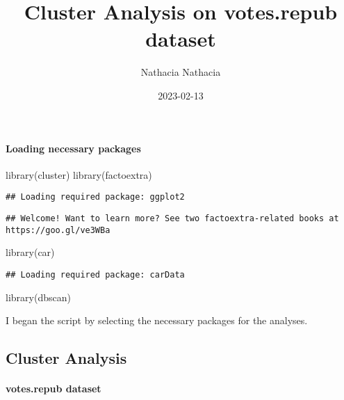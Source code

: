 \documentclass[
]{article}
\title{Cluster Analysis on votes.repub dataset}
\author{Nathacia Nathacia}
\date{2023-02-13}
\newenvironment{Shaded}{\begin{snugshade}}{\end{snugshade}}
\newcommand{\FunctionTok}[1]{\textcolor[rgb]{0.00,0.00,0.00}{#1}}
\newcommand{\NormalTok}[1]{#1}
\begin{document}
\maketitle

{
\setcounter{tocdepth}{3}
\tableofcontents
}
\hypertarget{loading-necessary-packages}{%
\paragraph{Loading necessary
packages}\label{loading-necessary-packages}}

\begin{Shaded}
\begin{Highlighting}[]
\FunctionTok{library}\NormalTok{(cluster)}
\FunctionTok{library}\NormalTok{(factoextra)}
\end{Highlighting}
\end{Shaded}

\begin{verbatim}
## Loading required package: ggplot2
\end{verbatim}

\begin{verbatim}
## Welcome! Want to learn more? See two factoextra-related books at https://goo.gl/ve3WBa
\end{verbatim}

\begin{Shaded}
\begin{Highlighting}[]
\FunctionTok{library}\NormalTok{(car)}
\end{Highlighting}
\end{Shaded}

\begin{verbatim}
## Loading required package: carData
\end{verbatim}

\begin{Shaded}
\begin{Highlighting}[]
\FunctionTok{library}\NormalTok{(dbscan)}
\end{Highlighting}
\end{Shaded}

I began the script by selecting the necessary packages for the analyses.

\hypertarget{cluster-analysis}{%
\subsection{Cluster Analysis}\label{cluster-analysis}}

\hypertarget{votes.repub-dataset}{%
\paragraph{votes.repub dataset}\label{votes.repub-dataset}}
\end{document}
